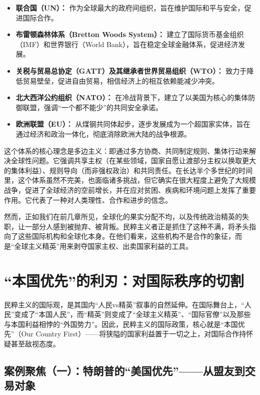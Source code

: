 \begin{itemize}
    \item \textbf{联合国（UN）：} 作为全球最大的政府间组织，旨在维护国际和平与安全，促进国际合作。
    \item \textbf{布雷顿森林体系（Bretton Woods System）：} 建立了国际货币基金组织（IMF）和世界银行（World Bank），旨在稳定全球金融体系，促进经济发展。
    \item \textbf{关税与贸易总协定（GATT）及其继承者世界贸易组织（WTO）：} 致力于降低贸易壁垒，促进自由贸易，相信经济上的相互依赖能减少冲突。
    \item \textbf{北大西洋公约组织（NATO）：} 在冷战背景下，建立了以美国为核心的集体防御联盟，强调“一个都不能少”的共同安全承诺。
    \item \textbf{欧洲联盟（EU）：} 从煤钢共同体起步，逐步发展成为一个超国家实体，旨在通过经济和政治一体化，彻底消除欧洲大陆的战争根源。
\end{itemize}

这个体系的核心理念是多边主义：即通过多方协商、共同制定规则、集体行动来解决全球性问题。它强调共享主权（在某些领域，国家自愿让渡部分主权以换取更大的集体利益）、规则导向（而非强权政治）和共同责任。在长达半个多世纪的时间里，这个体系虽然不完美，也面临诸多挑战，但它确实在很大程度上避免了大规模战争，促进了全球经济的空前增长，并在应对贫困、疾病和环境问题上发挥了重要作用。它代表了一种对人类理性、合作和进步的信念。

然而，正如我们在前几章所见，全球化的果实分配不均，以及传统政治精英的失职，让一部分人感到被抛弃、被背叛。民粹主义者正是抓住了这种不满，将矛头指向了这些国际机构和全球化本身。在他们看来，这些机构不是合作的象征，而是“全球主义精英”用来剥夺国家主权、出卖国家利益的工具。

\section{“本国优先”的利刃：对国际秩序的切割}

民粹主义的国际观，是其国内“人民vs精英”叙事的自然延伸。在国际舞台上，“人民”变成了“本国人民”，而“精英”则变成了“全球主义精英”、“国际官僚”以及那些与本国利益相悖的“外国势力”。因此，民粹主义的国际政策，核心就是“本国优先”（Our Country First）——将狭隘的国家利益置于一切之上，对国际合作持怀疑甚至敌视态度。

\subsection{案例聚焦（一）：特朗普的“美国优先”——从盟友到交易对象}

